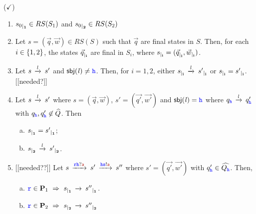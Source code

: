 \begin{lemma} ($\checkmark$) \hfill
\label{lem:indrestrict}  
\begin{enumerate}[1)]
\item
\label{lem:indrestrict-a}
${s_0}_{\mid_{\mathbf{1}}}\in RS(S_1)$ and  ${s_0}_{\mid_{\mathbf{2}}}\in RS(S_2)$
\item
\label{lem:indrestrict-abis}
Let $s= (\vec{q},\vec{w})\in RS(S)$ such that $\vec{q}$ are final states in $S$.
Then, for each $i\in\{1,2\}$, the states ${\vec{q}}_{\mid_{\mathbf{i}}}$ are final in $S_i$, where 
${s}_{\mid_{\mathbf{i}}}=({\vec{q}}_{\mid_{\mathbf{i}}},{\vec{w}}_{\mid_{\mathbf{i}}})$. 
\item
\label{lem:indrestrict-b}
Let $s\,\xrightarrow{\mathit{l}}_{{}}\,s'$ and $\mathsf{sbj}(\mathit{l})\neq{ \ensuremath{\mathtt{\color{blue}{ {h}}}} }$.
Then, for $i=1,2$,  either ${s}_{\mid_{\mathbf{i}}}\,\xrightarrow{\mathit{l}}_{{}}\,{s'}_{\mid_{\mathbf{i}}}$ or  ${s}_{\mid_{\mathbf{i}}}={s'}_{\mid_{\mathbf{i}}}$.
[[needed?]]
\item
\label{lem:indrestrict-c}
Let $s\,\xrightarrow{\mathit{l}}_{{}}\,s'$ where $s= (\vec{q},\vec{w})$, $s'= (\vec{q'},\vec{w'})$
and $\mathsf{sbj}(\mathit{l})={\mathtt{\color{blue}{ {h}}}}$ %
where %
$q_{\mathtt{\color{blue}{ {h}}}}\,\xrightarrow{\mathit{l}}_{{}}\,q'_{\mathtt{\color{blue}{ {h}}}}$ with $q_{\mathtt{\color{blue}{ {h}}}},q'_{\mathtt{\color{blue}{ {h}}}}\not\in\widehat{Q}$. Then
\begin{enumerate}[a)]
\item
\label{lem:indrestrict-c1}
${s}_{\mid_{\mathbf{1}}} = {s'}_{\mid_{\mathbf{1}}}$;
\item
\label{lem:indrestrict-c2}
${s}_{\mid_{\mathbf{2}}}\,\xrightarrow{\mathit{l}}_{{}}\,{s'}_{\mid_{\mathbf{2}}}$.
\end{enumerate}
\item
\label{lem:indrestrict-d} [[needed??]]
Let $s\lts{\ttr\HH?\msg[a]} s'\lts{\HH\tts!\msg[a]} s''$ where $s'= (\vec{q'},\vec{w'})$ with $q'_{\mathtt{\color{blue}{ {h}}}}\in \widehat{Q_{\mathtt{\color{blue}{ {h}}}}}$.
Then, 
\begin{enumerate}[a)]
\item
${\mathtt{\color{blue}{ {r}}}}\in\mathbf{P}_1 ~\Rightarrow~ {s}_{\mid_{\mathbf{1}}}\,\xrightarrow{}_{{}}\,{s''}_{\mid_{\mathbf{1}}}$.
\item
${\mathtt{\color{blue}{ {r}}}}\in\mathbf{P}_2 ~\Rightarrow~ {s}_{\mid_{\mathbf{2}}}\,\xrightarrow{}_{{}}\,{s''}_{\mid_{\mathbf{2}}}$
\end{enumerate}
\end{enumerate}
\end{lemma}

